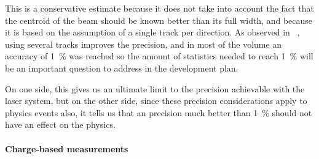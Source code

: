 This is a conservative estimate because it does not take into account the fact that the centroid of the beam should be known better than its full width, and because it is based on the assumption of a single track per direction.  
As observed in ~\cite{bib:uBlaser2019}, using several tracks improves the precision, and in most of the volume an accuracy of \SI{1}{\%} was reached so the amount of statistics needed to reach \SI{1}{\%} will be an important question to address in the development plan. 









On one side, this gives us an ultimate limit to the \efield precision achievable with the laser system, but on the other side, since these  precision considerations apply to physics events also, it tells us that an \efield precision much better than \SI{1}{\%} should not have an effect on the physics.


\paragraph{Charge-based measurements}


